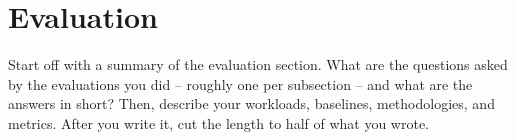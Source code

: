 \section{Evaluation}\label{sec:eval}

Start off with a summary of the evaluation section.
What are the questions asked by the evaluations you did -- roughly one per subsection -- and what are the answers in short?
Then, describe your workloads, baselines, methodologies, and metrics.
After you write it, cut the length to half of what you wrote.
